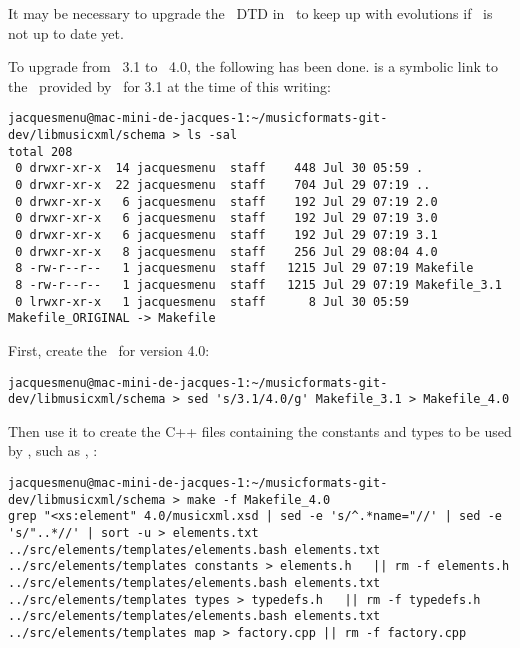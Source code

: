 It may be necessary to upgrade the \mxml\ DTD in \elementsFolder\ to keep up with evolutions if \libmusicxml\ is not up to date yet.

To upgrade from \mxml\ 3.1 to \mxml\ 4.0, the following has been done.  is a symbolic link to the \Makefile\ provided by \libmusicxml\ for 3.1 at the time of this writing:
\begin{lstlisting}[language=Terminal]
jacquesmenu@mac-mini-de-jacques-1:~/musicformats-git-dev/libmusicxml/schema > ls -sal
total 208
 0 drwxr-xr-x  14 jacquesmenu  staff    448 Jul 30 05:59 .
 0 drwxr-xr-x  22 jacquesmenu  staff    704 Jul 29 07:19 ..
 0 drwxr-xr-x   6 jacquesmenu  staff    192 Jul 29 07:19 2.0
 0 drwxr-xr-x   6 jacquesmenu  staff    192 Jul 29 07:19 3.0
 0 drwxr-xr-x   6 jacquesmenu  staff    192 Jul 29 07:19 3.1
 0 drwxr-xr-x   8 jacquesmenu  staff    256 Jul 29 08:04 4.0
 8 -rw-r--r--   1 jacquesmenu  staff   1215 Jul 29 07:19 Makefile
 8 -rw-r--r--   1 jacquesmenu  staff   1215 Jul 29 07:19 Makefile_3.1
 0 lrwxr-xr-x   1 jacquesmenu  staff      8 Jul 30 05:59 Makefile_ORIGINAL -> Makefile
\end{lstlisting}

First, create the \Makefile\ for version 4.0:
\begin{lstlisting}[language=Terminal]
jacquesmenu@mac-mini-de-jacques-1:~/musicformats-git-dev/libmusicxml/schema > sed 's/3.1/4.0/g' Makefile_3.1 > Makefile_4.0
\end{lstlisting}

Then use it to create the C++ files containing the constants and types to be used by \mxsrRepr, such as , :
\begin{lstlisting}[language=Terminal]
jacquesmenu@mac-mini-de-jacques-1:~/musicformats-git-dev/libmusicxml/schema > make -f Makefile_4.0
grep "<xs:element" 4.0/musicxml.xsd | sed -e 's/^.*name="//' | sed -e 's/"..*//' | sort -u > elements.txt
../src/elements/templates/elements.bash elements.txt ../src/elements/templates constants > elements.h   || rm -f elements.h
../src/elements/templates/elements.bash elements.txt ../src/elements/templates types > typedefs.h   || rm -f typedefs.h
../src/elements/templates/elements.bash elements.txt ../src/elements/templates map > factory.cpp || rm -f factory.cpp
\end{lstlisting}

